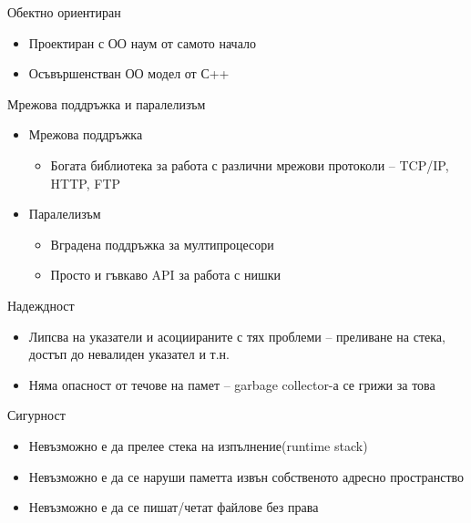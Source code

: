 \documentclass{beamer}
\begin{document}
\begin{frame}{Обектно ориентиран}
  \begin{itemize}
  \item Проектиран с ОО наум от самото начало
  \item Осъвършенстван ОО модел от С++
  \end{itemize}
\end{frame}


\begin{frame}{Мрежова поддръжка и паралелизъм}
  
  \begin{itemize}
    \item Мрежова поддръжка
  \begin{itemize}
  \item   Богата библиотека за работа с различни
    мрежови протоколи – TCP/IP, HTTP, FTP

  \end{itemize}
  \item Паралелизъм
    
    \begin{itemize}
    \item  Вградена поддръжка за мултипроцесори
    \item Просто и гъвкаво API за работа с нишки

    \end{itemize}

  \end{itemize}

\end{frame}


\begin{frame}{Надеждност}
  
  \begin{itemize}
    \item Липсва на указатели и асоциираните с
    тях проблеми – преливане на стека,
    достъп до невалиден указател и т.н.

    \item Няма опасност от течове на памет –
    garbage collector-а се грижи за това

  \end{itemize}

\end{frame}


\begin{frame}{Сигурност}
  
  \begin{itemize}
   \item Невъзможно е да прелее стека на
    изпълнение(runtime stack)
   \item Невъзможно е да се наруши паметта
    извън собственото адресно
    пространство
   \item Невъзможно е да се пишат/четат
    файлове без права

  \end{itemize}

\end{frame}
\end{document}
